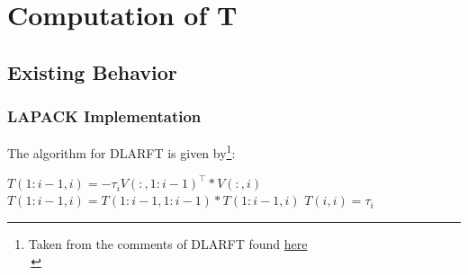 \documentclass[12pt]{beamer}
\begin{document}
    \section{Computation of T}
    \subsection{Existing Behavior}
    \begin{frame}
        \frametitle{LAPACK Implementation}
        The algorithm for DLARFT is given by\footnote{Taken from the comments of DLARFT found \textcolor{blue}{\href{https://netlib.org/lapack/explore-html//dd/daa/dlarft_8f_source.html}{here}}\\\,}:
        \begin{algorithmic}
                \State $T(1:i-1,i) = -\tau_i V(:,1:i-1)^\top * V(:,i)$
                \State $T(1:i-1,i) = T(1:i-1,1:i-1) * T(1:i-1,i)$
                \State $T(i,i) = \tau_i$
            \EndFor
        \end{algorithmic}

    \end{frame}
\end{document}
